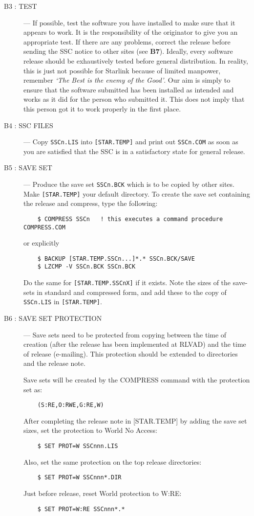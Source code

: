 \begin{description}
\item [B3 : TEST] ---
If possible, test the software you have installed to make sure that it appears
to work.
It is the responsibility of the originator to give you an appropriate test.
If there are any problems, correct the release before sending the SSC notice to
other sites (see {\bf B7}).
Ideally, every software release should be exhaustively tested before general
distribution.
In reality, this is just not possible for Starlink because of limited manpower,
remember {\em `The Best is the enemy of the Good'}.
Our aim is simply to ensure that the software submitted has been installed
as intended and works as it did for the person who submitted it.
This does not imply that this person got it to work properly in the first place.

\item [B4 : SSC FILES] ---
Copy {\tt SSCn.LIS} into {\tt [STAR.TEMP]} and print out {\tt SSCn.COM} as 
soon as you are satisfied that the SSC is in a satisfactory state for general 
release. 

\item [B5 : SAVE SET] ---
Produce the save set {\tt SSCn.BCK} which is to be copied by other sites.
Make {\tt [STAR.TEMP]} your default directory.
To create the save set containing the release and compress, type the following:
\begin{verbatim}
    $ COMPRESS SSCn   ! this executes a command procedure COMPRESS.COM
\end{verbatim}
or explicitly
\begin{verbatim}
    $ BACKUP [STAR.TEMP.SSCn...]*.* SSCn.BCK/SAVE
    $ LZCMP -V SSCn.BCK SSCn.BCK  
\end{verbatim}
Do the same for {\tt [STAR.TEMP.SSCnX]} if it exists.
Note the sizes of the save-sets in standard and compressed form, and add these
to the copy of {\tt SSCn.LIS} in {\tt [STAR.TEMP]}.

\item [B6 : SAVE SET PROTECTION] ---
Save sets need to be protected from copying between the time of creation
(after the release has been implemented at RLVAD) and the time of release
(e-mailing).
This protection should be extended to directories and the release note.

Save sets will be created by the COMPRESS command with the protection set as:
\begin{verbatim}
    (S:RE,O:RWE,G:RE,W)
\end{verbatim}
After completing the release note in [STAR.TEMP] by adding the save set sizes,
set the protection to World No Access:
\begin{verbatim}
    $ SET PROT=W SSCnnn.LIS
\end{verbatim}
Also, set the same protection on the top release directories:
\begin{verbatim}
    $ SET PROT=W SSCnnn*.DIR
\end{verbatim}
Just before release, reset World protection to W:RE:
\begin{verbatim}
    $ SET PROT=W:RE SSCnnn*.*
\end{verbatim}


\end{description}
